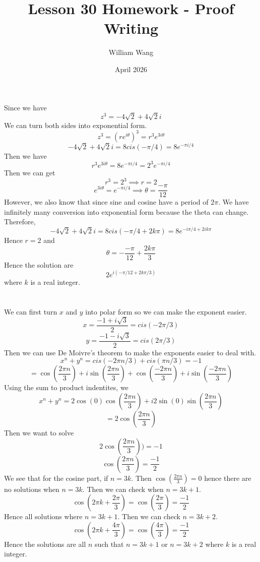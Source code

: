 \documentclass{article}
\title{Lesson 30 Homework - Proof Writing}
\author{William Wang}
\date{April 2026}
\begin{document}
\maketitle

\section{}
Since we have 
\[z^3 = -4\sqrt{2} + 4\sqrt{2}i\]
We can turn both sides into exponential form. 
\[z^3 = (re^{i\theta})^3 = r^3e^{3i\theta}\]
\[-4\sqrt{2} + 4\sqrt{2}i = 8cis(-\pi / 4) = 8e^{-\pi i / 4}\]
Then we have 
\[r^3e^{3i\theta} = 8e^{-\pi i /4} = 2^3e^{-\pi i /4}\]
Then we can get 
\[r^3 = 2^3 \implies r = 2\]
\[e^{3i\theta} = e^{-\pi i /4} \implies \theta = \frac{-\pi}{12}\]
However, we also know that since sine and cosine have a period of $2\pi$. We have infinitely many conversion into exponential form because the theta can change. Therefore,
\[-4\sqrt{2}+4\sqrt{2}i = 8cis(-\pi/4 + 2k\pi) = 8e^{-i\pi/4+2ik\pi}\]
Hence $r = 2$ and 
\[\theta = -\frac{-\pi}{12}+\frac{2k\pi}{3} \]
Hence the solution are 
\[2e^{i(-\pi/12 + 2k\pi/3)}\]
where $k$ is a real integer. 

\section{}
We can first turn $x$ and $y$ into polar form so we can make the exponent easier. 
\[x = \frac{-1+i\sqrt{3}}{2} = cis(-2\pi/3 )\]
\[y = \frac{-1-i\sqrt{3}}{2} = cis(2\pi/3 )\]
Then we can use De Moivre's theorem to make the exponents easier to deal with.
\[x^n + y^n = cis(-2\pi n /3) +cis(\pi n /3)=-1\]
\[= \cos(\frac{2\pi n }{3}) + i\sin(\frac{2\pi n }{3}) + \cos(\frac{-2\pi n }{3}) + i\sin(\frac{-2\pi n }{3} )\]
Using the sum to product indentites, we 
\[x^n + y^n = 2\cos(0)\cos(\frac{2\pi n}{3} ) + i2\sin(0)\sin(\frac{2\pi n}{3})\]
\[= 2\cos(\frac{2\pi n}{3})\]
Then we want to solve 
\[2\cos(\frac{2\pi n }{3})) = -1\]
\[\cos(\frac{2\pi n}{3}) = \frac{-1}{2}\]
We see that for the cosine part, if \(n = 3k\). Then \(\cos(\frac{2\pi n}{3})=0\) hence there are no solutions when \(n = 3k\). Then we can check when \(n = 3k+1\). 
\[\cos(2\pi k +\frac{2\pi}{3}) =\cos(\frac{2\pi}{3}) = \frac{-1}{2}\]
Hence all solutions where $n = 3k+1$. Then we can check $n = 3k+2$.
\[\cos(2\pi k+\frac{4\pi}{3}) = \cos(\frac{4\pi}{3}) = \frac{-1}{2}\]
Hence the solutions are all $n$ such that $n = 3k+1$ or $n = 3k+2$ where $k$ is a real integer. 
\end{document}

